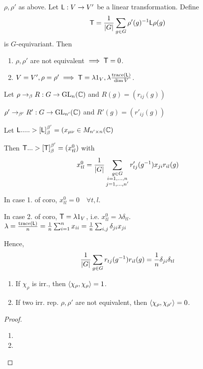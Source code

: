 \begin{coro}
  $\rho, \rho'$ as above. Let ${\sf L}: V \to V'$ be a linear transformation.
  Define
  \[
    {\sf T} = \frac{1}{\lvert G\rvert} \sum_{g\in G} \rho'(g)^{-1} {\sf L} \rho(g)
  \]
  is $G$-equivariant. Then
  \begin{enumerate}
    \item $\rho, \rho'$ are not equivalent $\implies {\sf T} = 0$.
    \item $V = V', \rho = \rho' \implies {\sf T} = \lambda 1_V,
      \lambda \frac{\operatorname{trace}({\sf L})}{\dim V}$.
  \end{enumerate}
\end{coro}

\begin{remark}
  Let $\rho \to_\beta R: G \to \text{GL}_n(\mathbb{C})$ and $R(g) = (r_{ij}(g))$

  $\rho' \to_{\beta'} R': G \to \text{GL}_{n'}(\mathbb{C})$ and $R'(g) = (r'_{ij}(g))$

  Let ${\sf L} .....> [{\sf L}]^{\beta'}_\beta =
  (x_{\mu\nu} \in M_{n' \times n}(\mathbb{C})$

  Then ${\sf T} ...> [{\sf T}]^{\beta'}_\beta = (x^0_{tl})$ with
  \[
    x^0_{tl} = \frac{1}{\lvert G\rvert}
    \sum_{\substack{g\in G \\ i=1,\dots, n \\ j=1,\dots, n'}}
    r'_{tj}(g^{-1})x_{ji}r_{il}(g)
  \]

  In case 1. of coro, $x^0_{tl} = 0 \quad \forall t, l$.


  In case 2. of coro, ${\sf T} = \lambda 1_V$, i.e.
  $x^0_{tl} = \lambda \delta_{tl}$.
  $\lambda = \frac{\operatorname{trace}({\sf L})}{n} = \frac{1}{n} \sum_{i=1}^n x_{ii}
  = \frac{1}{n} \sum_{i,j} \delta_{ji}x_{ji}$

  Hence,
  \[
    \frac{1}{\lvert G\rvert} \sum_{g\in G}
    r_{tj}(g^{-1})r_{il}(g) = \frac{1}{n} \delta_{ji}\delta_{tl}
  \]
\end{remark}

\begin{prop} \mbox{}
  \begin{enumerate}
    \item If $\chi_\rho$ is irr., then $\langle\chi_\rho, \chi_\rho\rangle = 1$.
    \item If two irr. rep. $\rho, \rho'$ are not equivalent, then
      $\langle\chi_\rho, \chi_{\rho'}\rangle = 0$.
  \end{enumerate}

  \begin{proof}
    \begin{enumerate}
      \item
      \item 
    \end{enumerate}
  \end{proof}
\end{prop}

